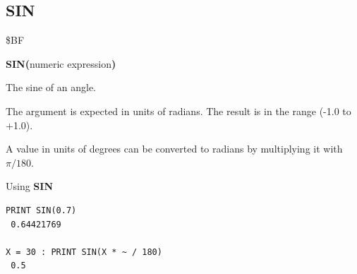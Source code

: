 \subsection{SIN}
\begin{description}[leftmargin=2cm,style=nextline]
\item [Token:]    \$BF

\item [Format:]   {\bf SIN(}numeric expression{\bf)}

\item [Returns:]  The sine of an angle.

                  The argument is expected in units of radians. The result is in the range (-1.0 to +1.0).

\item [Remarks:]  A value in units of degrees can be converted to radians by multiplying it with $\pi/180$.

\item [Examples:] Using {\bf SIN}

\begin{tcolorbox}[colback=black,coltext=white]
\verbatimfont{\codefont}
\begin{verbatim}
PRINT SIN(0.7)
 0.64421769

X = 30 : PRINT SIN(X * ~ / 180)
 0.5
\end{verbatim}
\end{tcolorbox}
\end{description}


\newpage
